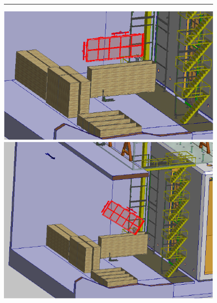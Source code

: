 \begin{figure}[!htb]
\begin{center}
\begin{minipage}[c]{0.49\textwidth}
\end{minipage}
%
\vspace{5mm}
\hrule
\vspace{5mm}
%
\begin{minipage}[c]{0.32\textwidth}
\includegraphics[width=\textwidth]{far-detector-single-phase/figures/APA-1.pdf}
\end{minipage}
\begin{minipage}[c]{0.32\textwidth}
\includegraphics[width=\textwidth]{far-detector-single-phase/figures/APA-2.pdf}
\end{minipage}
\begin{minipage}[c]{0.32\textwidth}

\end{minipage}
\end{center}
\end{figure}
